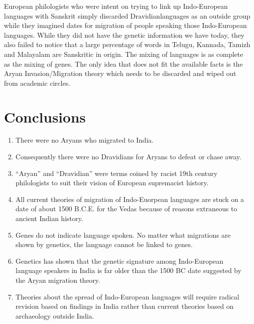 European philologists who were intent on trying to link up Indo-\break European languages with Sanskrit simply discarded Dravidian\break languages as an outside group while they imagined dates for migration of people speaking those Indo-European languages. While they did not have the genetic information we have today, they also failed to notice that a large percentage of words in Telugu, Kannada, Tamizh and Malayalam are Sanskritic in origin. The mixing of languages is as complete as the mixing of genes. The only idea that does not fit the available facts is the Aryan Invasion/Migration theory which needs to be discarded and wiped out from academic circles.


\section*{Conclusions}

\begin{enumerate}[{\rm 1)}]
\itemsep=0pt
\item There were no Aryans who migrated to India.

 \item Consequently there were no Dravidians for Aryans to defeat or chase away.

 \item “Aryan” and “Dravidian” were terms coined by racist 19th century philologists to suit their vision of European supremacist history.

 \item All current theories of migration of Indo-Euorpean languages are stuck on a date of about 1500 B.C.E. for the Vedas because of reasons extraneous to ancient Indian history.

 \item Genes do not indicate language spoken. No matter what migrations are shown by genetics, the language cannot be linked to genes.

 \item Genetics has shown that the genetic signature among Indo-European language speakers in India is far older than the 1500 BC date suggested by the Aryan migration theory.

 \item Theories about the spread of Indo-European languages will require radical revision based on findings in India rather than current theories based on archaeology outside India.

\end{enumerate}


